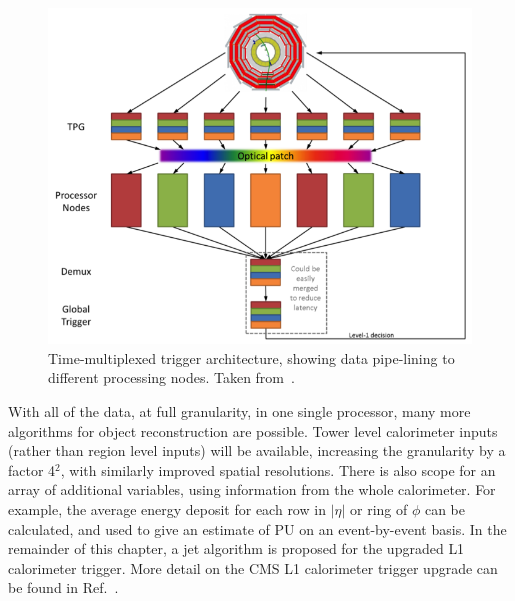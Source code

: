 \begin{figure}[h]
\begin{center}
  \includegraphics[scale=0.8]{Figures/l1jets/TMTrigger.png}

\caption{Time-multiplexed trigger architecture, showing data pipe-lining to different processing nodes. Taken from~\cite{RoseTrig}.}
\label{fig:TMTrig}
\end{center}
\end{figure}


With all of the data, at full granularity, in one single processor, many more algorithms for object reconstruction are possible. 
Tower level calorimeter inputs (rather than region level inputs) will be available, increasing the granularity by a factor 4$^{2}$, with similarly improved spatial resolutions.
There is also scope for an array of additional variables, using information from the whole calorimeter. For example, the average energy deposit for each row in $|\eta|$ or ring of $\phi$ can be calculated, and used to give an estimate of \ac{PU} on an event-by-event basis.
In the remainder of this chapter, a jet algorithm is proposed for the upgraded \ac{L1} calorimeter trigger.
More detail on the CMS \ac{L1} calorimeter trigger upgrade can be found in Ref.~\cite{1748-0221-9-01-C01006}.


%        


